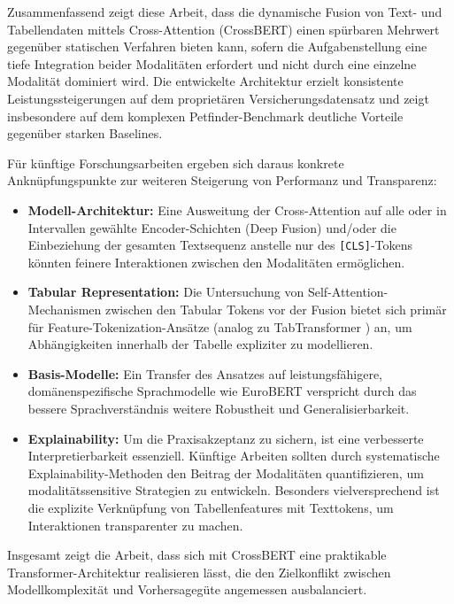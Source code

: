 Zusammenfassend zeigt diese Arbeit, dass die dynamische Fusion von Text- und Tabellendaten mittels Cross-Attention (CrossBERT) einen spürbaren Mehrwert gegenüber statischen Verfahren bieten kann, sofern die Aufgabenstellung eine tiefe Integration beider Modalitäten erfordert und nicht durch eine einzelne Modalität dominiert wird. Die entwickelte Architektur erzielt konsistente Leistungssteigerungen auf dem proprietären Versicherungsdatensatz und zeigt insbesondere auf dem komplexen Petfinder-Benchmark deutliche Vorteile gegenüber starken Baselines.

Für künftige Forschungsarbeiten ergeben sich daraus konkrete Anknüpfungspunkte zur weiteren Steigerung von Performanz und Transparenz:
\begin{itemize}
    \item \textbf{Modell-Architektur:} Eine Ausweitung der Cross-Attention auf alle oder in Intervallen gewählte Encoder-Schichten (Deep Fusion) und/oder die Einbeziehung der gesamten Textsequenz anstelle nur des \texttt{[CLS]}-Tokens könnten feinere Interaktionen zwischen den Modalitäten ermöglichen.
    \item \textbf{Tabular Representation:} Die Untersuchung von Self-Attention-Mechanismen zwischen den Tabular Tokens vor der Fusion bietet sich primär für Feature-Tokenization-Ansätze (analog zu TabTransformer \cite{Huang2020}) an, um Abhängigkeiten innerhalb der Tabelle expliziter zu modellieren.
    \item \textbf{Basis-Modelle:} Ein Transfer des Ansatzes auf leistungsfähigere, domänenspezifische Sprachmodelle wie EuroBERT \cite{Boizard2025} verspricht durch das bessere Sprachverständnis weitere Robustheit und Generalisierbarkeit.
    \item \textbf{Explainability:} Um die Praxisakzeptanz zu sichern, ist eine verbesserte Interpretierbarkeit essenziell. Künftige Arbeiten sollten durch systematische Explainability-Methoden den Beitrag der Modalitäten quantifizieren, um modalitätssensitive Strategien zu entwickeln. Besonders vielversprechend ist die explizite Verknüpfung von Tabellenfeatures mit Texttokens, um Interaktionen transparenter zu machen.
\end{itemize}
Insgesamt zeigt die Arbeit, dass sich mit CrossBERT eine praktikable Transformer-Architektur realisieren lässt, die den Zielkonflikt zwischen Modellkomplexität und Vorhersagegüte angemessen ausbalanciert.
